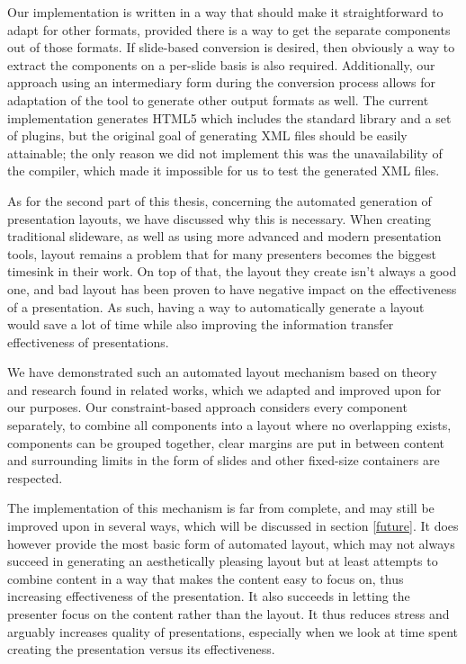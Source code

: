    Our implementation is written in a way that should make it straightforward
   to adapt for other formats, provided there is a way to get the separate
   components out of those formats. If slide-based conversion is desired, then
   obviously a way to extract the components on a per-slide basis is also
   required. Additionally, our approach using an intermediary form during the
   conversion process allows for adaptation of the tool to generate other
   output formats as well. The current implementation generates HTML5 which
   includes the \mxp standard library and a set of plugins, but the original
   goal of generating \mxp XML files should be easily attainable; the only
   reason we did not implement this was the unavailability of the \mxp
   compiler, which made it impossible for us to test the generated XML files.

   As for the second part of this thesis, concerning the automated generation
   of presentation layouts, we have discussed why this is necessary. When
   creating traditional slideware, as well as using more advanced and modern
   presentation tools, layout remains a problem that for many presenters
   becomes the biggest timesink in their work. On top of that, the layout they
   create isn't always a good one, and bad layout has been proven to have
   negative impact on the effectiveness of a presentation. As such, having a
   way to automatically generate a layout would save a lot of time while also
   improving the information transfer effectiveness of presentations.

   We have demonstrated such an automated layout mechanism based on theory and
   research found in related works, which we adapted and improved upon for our
   purposes. Our constraint-based approach considers every component
   separately, to combine all components into a layout where no overlapping
   exists, components can be grouped together, clear margins are put in between
   content and surrounding limits in the form of slides and other fixed-size
   containers are respected.

   The implementation of this mechanism is far from complete, and may still be
   improved upon in several ways, which will be discussed in section
   \ref{future}. It does however provide the most basic form of automated
   layout, which may not always succeed in generating an aesthetically pleasing
   layout but at least attempts to combine content in a way that makes the
   content easy to focus on, thus increasing effectiveness of the presentation.
   It also succeeds in letting the presenter focus on the content rather than
   the layout. It thus reduces stress and arguably increases quality of
   presentations, especially when we look at time spent creating the
   presentation versus its effectiveness.

